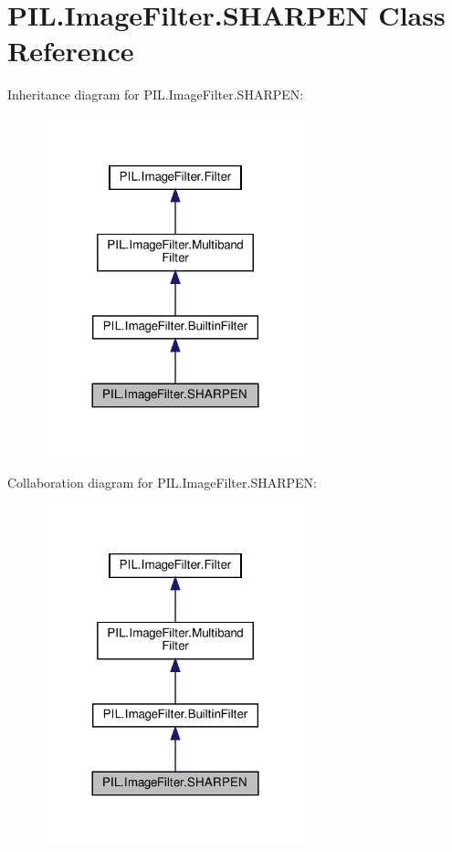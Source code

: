 \hypertarget{classPIL_1_1ImageFilter_1_1SHARPEN}{}\section{P\+I\+L.\+Image\+Filter.\+S\+H\+A\+R\+P\+EN Class Reference}
\label{classPIL_1_1ImageFilter_1_1SHARPEN}


Inheritance diagram for P\+I\+L.\+Image\+Filter.\+S\+H\+A\+R\+P\+EN\+:
\nopagebreak
\begin{figure}[H]
\begin{center}
\leavevmode
\includegraphics[width=216pt]{classPIL_1_1ImageFilter_1_1SHARPEN__inherit__graph}
\end{center}
\end{figure}


Collaboration diagram for P\+I\+L.\+Image\+Filter.\+S\+H\+A\+R\+P\+EN\+:
\nopagebreak
\begin{figure}[H]
\begin{center}
\leavevmode
\includegraphics[width=216pt]{classPIL_1_1ImageFilter_1_1SHARPEN__coll__graph}
\end{center}
\end{figure}
